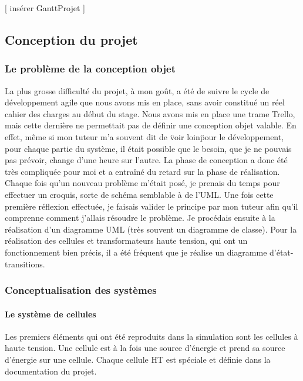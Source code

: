 \documentclass[a4paper]{article}
\begin{document}
     [ insérer GanttProjet ]   

    \subsection{Conception du projet}

    \subsubsection{Le problème de la conception objet}

    La plus grosse difficulté du projet, à mon goût, a été de suivre le cycle de développement agile que nous avons mis en place, sans avoir constitué un réel cahier des charges au début du stage. Nous avons mis en place une trame Trello, mais cette dernière ne permettait pas de définir une conception objet valable. En effet, même si mon tuteur m'a souvent dit de \"voir loin\" pour le développement, pour chaque partie du système, il était possible que le besoin, que je ne pouvais pas prévoir, change d'une heure sur l'autre. La phase de conception a donc été très compliquée pour moi et a entraîné du retard sur la phase de réalisation. \\
    
    Chaque fois qu'un nouveau problème m'était posé, je prenais du temps pour effectuer un croquis, sorte de schéma semblable à de l'UML. Une fois cette première réflexion effectuée, je faisais valider le principe par mon tuteur afin qu'il comprenne comment j'allais résoudre le problème. Je procédais ensuite à la réalisation d'un diagramme UML (très souvent un diagramme de classe). Pour la réalisation des cellules et transformateurs haute tension, qui ont un fonctionnement bien précis, il a été fréquent que je réalise un diagramme d'état-transitions. \\ 

    \subsubsection{Conceptualisation des systèmes}

    \paragraph{Le système de cellules}

    Les premiers éléments qui ont été reproduits dans la simulation sont les cellules à haute tension. Une cellule est à la fois une source d'énergie et prend sa source d'énergie sur une cellule. Chaque cellule HT est spéciale et définie dans la documentation du projet. \\
\end{document}
